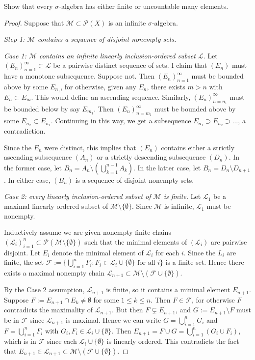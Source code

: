 \documentclass{article}
\begin{document}
 Show that every $\sigma$-algebra has either finite or uncountable many elements.
\begin{proof}
Suppose that $\mathcal M \subset \mathcal P (X)$ is an infinite $\sigma$-algebra. 

\emph{Step 1: $\mathcal M$ contains a sequence of disjoint nonempty sets.}

\emph{Case 1: $\mathcal M$ contains an infinite linearly inclusion-ordered subset $\mathcal L$}.  Let $(E_n)_{n=1}^\infty \subset \mathcal L$ be a pairwise distinct sequence of sets. I claim that $(E_n)$ must have a monotone subsequence. Suppose not. Then $(E_n)_{n=1}^\infty$ must be bounded above by some $E_{n_1}$, for otherwise, given any $E_n$, there exists $m > n$ with $E_n \subset E_m$. This would define an ascending sequence.  Similarly, $(E_n)_{n=n_1}^\infty$ must be bounded below by say $E_{m_1}$.  Then $(E_n)_{n=m_1}^\infty$ must be bounded above by some $E_{n_2} \subset E_{n_1}$. Continuing in this way, we get a subsequence $E_{n_1} \supset E_{n_2} \supset \ldots$, a contradiction.


Since the $E_n$ were distinct, this implies that $(E_n)$ contains either a strictly ascending subsequence $(A_n)$ or a strictly descending subsequence $(D_n)$.  In the former case, let $B_n = A_n \setminus ( \bigcup_{k=1}^{n-1} A_k)$. In the latter case, let $B_n = D_n \setminus D_{n+1}$.  In either case, $(B_n)$ is a sequence of disjoint nonempty sets.

\emph{Case 2: every linearly inclusion-ordered subset of $\mathcal M$ is finite.}  Let $\mathcal L_1$  be a maximal linearly ordered subset of $\mathcal M \setminus \{\emptyset\}$.  Since $\mathcal M$ is infinite, $\mathcal L_1$ must be nonempty.

Inductively assume we are given nonempty finite chains $(\mathcal L_i)_{i=1}^n \subset \mathcal P ( \mathcal M \setminus \{\emptyset\} )$ such that the minimal elements of $(\mathcal L_i)$ are pairwise disjoint. Let $E_i$ denote the minimal element of $\mathcal L_i$ for each $i$.  Since the $L_i$ are finite, the set $\mathcal F := \{ \bigcup_{i=1}^n F_i : F_i \in \mathcal L_i \cup \{\emptyset\} \text { for all } i \}$ is a finite set. Hence there exists a maximal nonempty chain $\mathcal L_{n+1} \subset \mathcal M \setminus (\mathcal F \cup \{\emptyset\})$. 

By the Case 2 assumption, $\mathcal L_{n+1}$ is finite, so it contains a minimal element $E_{n+1}$.  Suppose $F := E_{n+1} \cap E_k \neq \emptyset$ for some $1\le k \le n$.  Then $F \in \mathcal F$, for otherwise $F$ contradicts the maximality of $\mathcal L_{n+1}$.  But then $F \subsetneq E_{n+1}$, and $G := E_{n+1} \setminus F$ must be in $\mathcal F$ since $\mathcal L_{n+1}$ is maximal.  Hence we can write $G = \bigcup_{i=1}^n G_i$ and $F = \bigcup_{i=1}^n F_i$ with $G_i, F_i \in \mathcal L_i \cup \{\emptyset\}$. 
Then $E_{n+1} = F \cup G = \bigcup_{i=1}^n (G_i \cup F_i)$, which is in $\mathcal F$ since each $\mathcal L_i \cup \{\emptyset\}$ is linearly ordered. This  contradicts the fact that $E_{n+1} \in \mathcal L_{n+1} \subset \mathcal M \setminus (\mathcal F \cup \{\emptyset\})$.


\end{proof}
\end{document}
